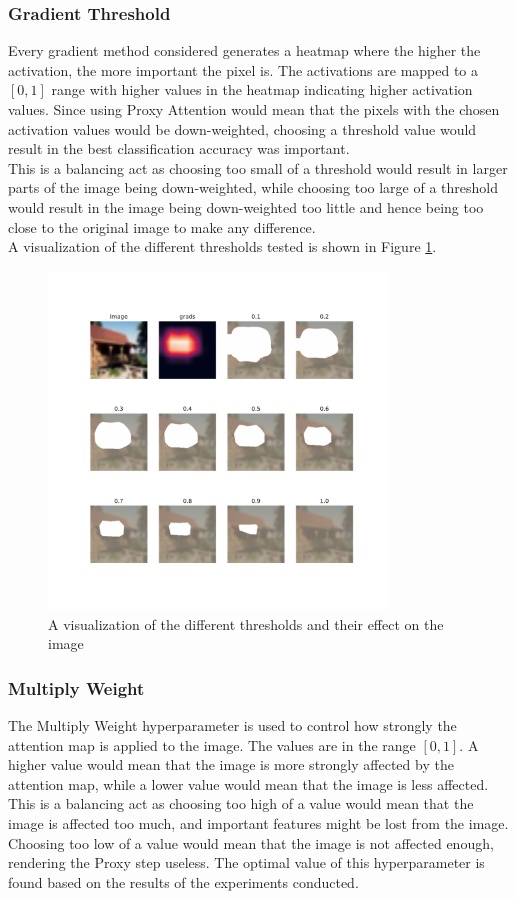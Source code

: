 \subsubsection{Gradient Threshold}
Every gradient method considered generates a heatmap where the higher the activation, the more important the pixel is. The activations are mapped to a $[0,1]$ range with higher values in the heatmap indicating higher activation values. Since using Proxy Attention would mean that the pixels with the chosen activation values would be down-weighted, choosing a threshold value would result in the best classification accuracy was important.\\
This is a balancing act as choosing too small of a threshold would result in larger parts of the image being down-weighted, while choosing too large of a threshold would result in the image being down-weighted too little and hence being too close to the original image to make any difference.\\
A visualization of the different thresholds tested is shown in Figure \ref{fig:thresholds}.

\begin{figure}[H]
    \centering
    \includegraphics[width=0.8\textwidth]{images/grad_threshold.pdf}
    \caption{A visualization of the different thresholds and their effect on the image}
    \label{fig:thresholds}
\end{figure}

\subsubsection{Multiply Weight}
The Multiply Weight hyperparameter is used to control how strongly the attention map is applied to the image. The values are in the range $[0,1]$. A higher value would mean that the image is more strongly affected by the attention map, while a lower value would mean that the image is less affected. This is a balancing act as choosing too high of a value would mean that the image is affected too much, and important features might be lost from the image. Choosing too low of a value would mean that the image is not affected enough, rendering the Proxy step useless. The optimal value of this hyperparameter is found based on the results of the experiments conducted.


